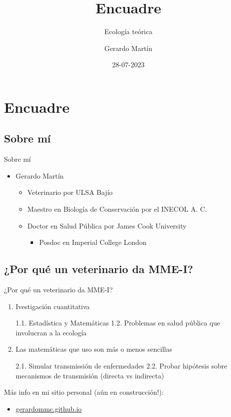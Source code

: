 \documentclass[
  11pt,
  ignorenonframetext,
]{beamer}
\title{Encuadre}
\subtitle{Ecología teórica}
\author{Gerardo Martín}
\date{28-07-2023}
\providecommand{\tightlist}{%
  \setlength{\itemsep}{0pt}\setlength{\parskip}{0pt}}
\begin{document}
\frame{\titlepage}

\hypertarget{encuadre}{%
\section{Encuadre}\label{encuadre}}

\hypertarget{sobre-muxed}{%
\subsection{Sobre mí}\label{sobre-muxed}}

\begin{frame}{Sobre mí}
\begin{itemize}
\item
  Gerardo Martín

  \begin{itemize}
  \tightlist
  \item
    Veterinario por ULSA Bajío
  \item
    Maestro en Biología de Conservación por el INECOL A. C.
  \item
    Doctor en Salud Pública por James Cook University

    \begin{itemize}
    \tightlist
    \item
      Posdoc en Imperial College London
    \end{itemize}
  \end{itemize}
\end{itemize}
\end{frame}

\hypertarget{por-quuxe9-un-veterinario-da-mme-i}{%
\subsection{¿Por qué un veterinario da
MME-I?}\label{por-quuxe9-un-veterinario-da-mme-i}}

\begin{frame}{¿Por qué un veterinario da MME-I?}
\begin{enumerate}
\item
  Ivestigación cuantitativa

  1.1. Estadística y Matemáticas 1.2. Problemas en salud pública que
  involucran a la ecología
\item
  Las matemáticas que uso son más o menos sencillas

  2.1. Simular transmissión de enfermedades 2.2. Probar hipótesis sobre
  mecanismos de transmisión (directa vs indirecta)
\end{enumerate}

Más info en mi sitio personal (aún en construcción!):

\begin{itemize}
\tightlist
\item
  \href{https://gerardommc.gihub.io}{gerardommc.github.io}
\end{itemize}
\end{frame}
\end{document}
